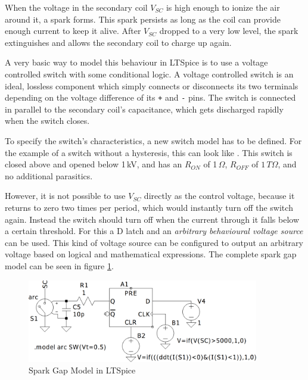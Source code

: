 When the voltage in the secondary coil \(V_{SC}\) is high enough to ionize the air around it, a spark forms. This spark persists as long as the coil can provide enough current to keep it alive. After \(V_{SC}\) dropped to a very low level, the spark extinguishes and allows the secondary coil to charge up again.

A very basic way to model this behaviour in LTSpice is to use a voltage controlled switch with some conditional logic. A voltage controlled switch is an ideal, lossless component which simply connects or disconnects its two terminals depending on the voltage difference of its \texttt{+} and \texttt{-} pins. The switch is connected in parallel to the secondary coil's capacitance, which gets discharged rapidly when the switch closes.

To specify the switch's characteristics, a new switch model has to be defined. For the example of a switch without a hysteresis, this can look like . This switch is closed above and opened below 1\,kV, and has an \(R_{ON}\) of 1\,\(\Omega\), \(R_{OFF}\) of \(1\,T\Omega\), and no additional parasitics. 

However, it is not possible to use \(V_{SC}\) directly as the control voltage, because it returns to zero two times per period, which would instantly turn off the switch again. Instead the switch should turn off when the current through it falls below a certain threshold. For this a D latch and an \emph{arbitrary behavioural voltage source} can be used. This kind of voltage source can be configured to output an arbitrary voltage based on logical and mathematical expressions. The complete spark gap model can be seen in figure \ref{fig:ltspice-sparkgap}.

\begin{figure}[h!]
    \centering
    \includegraphics[width=0.9\textwidth]{simon/resources/ltspice_sparkgap.png}
    \caption{Spark Gap Model in LTSpice}
    \label{fig:ltspice-sparkgap}
\end{figure}


